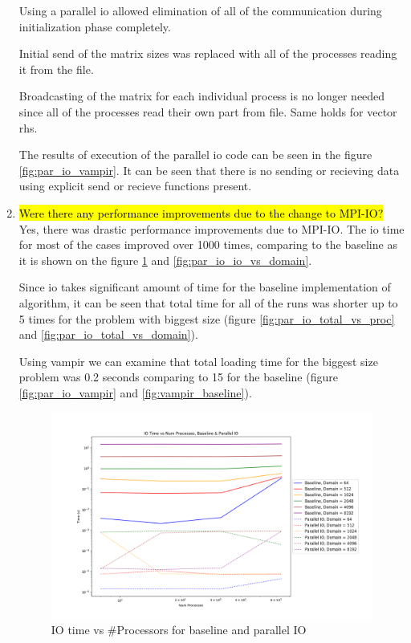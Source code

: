 \begin{enumerate}
  Using a parallel io allowed elimination of all of the communication during initialization phase completely.

  Initial send of the matrix sizes was replaced with all of the processes reading it from the file.

  Broadcasting of the matrix for each individual process is no longer needed since all of the processes read their own 
  part from file. Same holds for vector rhs.

  The results of execution of the parallel io code can be seen in the figure \ref{fig:par_io_vampir}. It can be seen
  that there is no sending or recieving data using explicit send or recieve functions present.

  \item \hl{Were there any performance improvements due to the change to MPI-IO?}
  Yes, there was drastic performance improvements due to MPI-IO. The io time for most of the cases improved over 1000
  times, comparing to the baseline as it is shown on the figure \ref{fig:par_io_io_vs_proc} and 
  \ref{fig:par_io_io_vs_domain}.

  Since io takes significant amount of time for the baseline implementation of algorithm, it can be seen that 
  total time for all of the runs was shorter up to 5 times for the problem with biggest size (figure 
  \ref{fig:par_io_total_vs_proc} and \ref{fig:par_io_total_vs_domain}).

  Using vampir we can examine that total loading time for the biggest size problem was 0.2 seconds comparing to 15 
  for the baseline (figure \ref{fig:par_io_vampir} and \ref{fig:vampir_baseline}).

  \begin{figure}[p] %
    \begin{center}
      \includegraphics[width=.9\linewidth]{Figures/io/io_multdomain_haswell_io_baseline.png} %
      \caption{IO time vs \#Processors for baseline and parallel IO}
      \label{fig:par_io_io_vs_proc}
    \end{center}
 \end{figure}
 

\end{enumerate}
